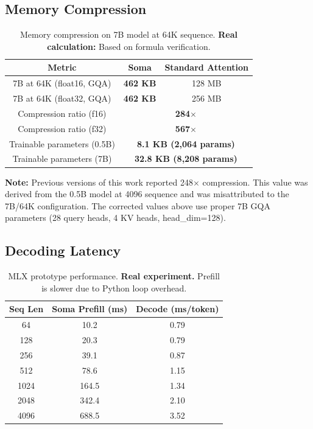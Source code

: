 \documentclass[11pt]{article}
\begin{document}
\subsection{Memory Compression}

\begin{table}[h]
\centering
\begin{tabular}{ccc}
\toprule
Metric & Soma & Standard Attention \\
\midrule
7B at 64K (float16, GQA) & \textbf{462 KB} & 128 MB \\
7B at 64K (float32, GQA) & \textbf{462 KB} & 256 MB \\
Compression ratio (f16) & \multicolumn{2}{c}{\textbf{284$\times$}} \\
Compression ratio (f32) & \multicolumn{2}{c}{\textbf{567$\times$}} \\
Trainable parameters (0.5B) & \multicolumn{2}{c}{\textbf{8.1 KB (2,064 params)}} \\
Trainable parameters (7B) & \multicolumn{2}{c}{\textbf{32.8 KB (8,208 params)}} \\
\bottomrule
\end{tabular}
\caption{Memory compression on 7B model at 64K sequence. \textbf{Real calculation:} Based on formula verification.}
\end{table}

\noindent\textbf{Note:} Previous versions of this work reported 248$\times$ compression. This value was derived from the 0.5B model at 4096 sequence and was misattributed to the 7B/64K configuration. The corrected values above use proper 7B GQA parameters (28 query heads, 4 KV heads, head\_dim=128).

\subsection{Decoding Latency}

\begin{table}[h]
\centering
\begin{tabular}{ccc}
\toprule
Seq Len & Soma Prefill (ms) & Decode (ms/token) \\
\midrule
64 & 10.2 & 0.79 \\
128 & 20.3 & 0.79 \\
256 & 39.1 & 0.87 \\
512 & 78.6 & 1.15 \\
1024 & 164.5 & 1.34 \\
2048 & 342.4 & 2.10 \\
4096 & 688.5 & 3.52 \\
\bottomrule
\end{tabular}
\caption{MLX prototype performance. \textbf{Real experiment.} Prefill is slower due to Python loop overhead.}
\end{table}
\end{document}
